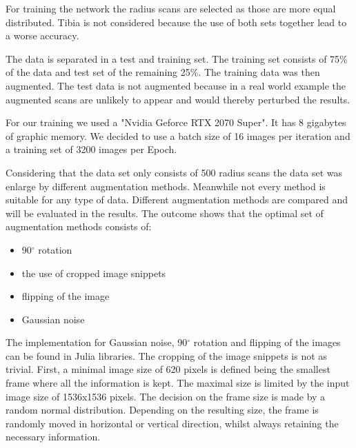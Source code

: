 \documentclass[
a4paper, 
12pt,
grayscalebody, %
abstract=on,
twoside, BCOR10mm, 12pt, DIV13,headinclude, footexclude, final, abstracton, openright
]{ibireprt}
\numberwithin{equation}{chapter}
\numberwithin{table}{chapter}
\numberwithin{figure}{chapter}
\numberwithin{algorithm}{chapter}
\numberwithin{example}{chapter}
\numberwithin{example}{chapter}
\begin{document}
For training the network the radius scans are selected as those are more equal distributed. Tibia is not considered because the use of both sets together lead to a worse accuracy.

The data is separated in a test and training set. The training set consists of 75\% of the data and test set of the remaining 25\%. The training data was then augmented. The test data is not augmented because in a real world example the augmented scans are unlikely to appear and would thereby perturbed the results. 

For our training we used a "Nvidia Geforce RTX 2070 Super". It has 8 gigabytes of graphic memory. We decided to use a batch size of 16 images per iteration and a training set of 3200 images per Epoch. 

Considering that the data set only consists of 500 radius scans the data set was enlarge by different augmentation methods. Meanwhile not every method is suitable for any type of data. Different augmentation methods are compared and will be evaluated in the results. The outcome shows that the optimal set of augmentation methods consists of:

\begin{itemize}
	\item 90$^{\circ}$ rotation
		\item the use of cropped image snippets 
	\item flipping of the image
	\item Gaussian noise

\end{itemize}

The implementation for Gaussian noise, 90$^{\circ}$ rotation and flipping of the images can be found in Julia libraries. The cropping of the image snippets is not as trivial. First, a minimal image size of 620 pixels is defined being the smallest frame where all the information is kept. The maximal size is limited by the input image size of 1536x1536 pixels. The decision on the frame size is made by a random normal distribution. Depending on the resulting size, the frame is randomly moved in horizontal or vertical direction, whilst always retaining the necessary information.
\end{document}
